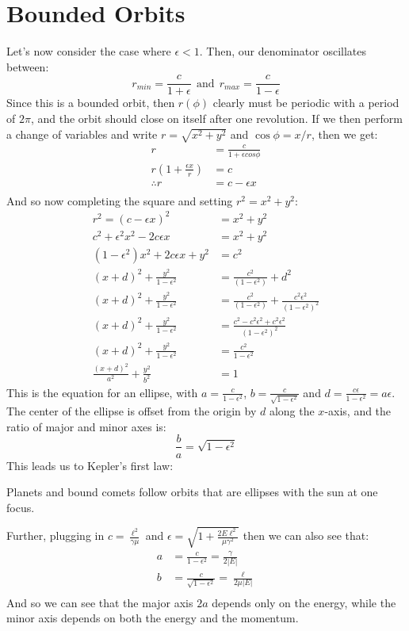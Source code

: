\section{Bounded Orbits}
Let's now consider the case where $\epsilon < 1$. Then, our denominator oscillates between: 
\[ r_{min} = \frac{c}{1 + \epsilon} \ \ \text{and} \ \ r_{max} = \frac{c}{1 - \epsilon}\] 
Since this is a bounded orbit, then $r(\phi)$ clearly must be periodic with a period of $2\pi$, and the orbit 
should close on itself after one revolution. If we then perform a change of variables and write $r = \sqrt{x^2 + 
y^2} $ and $\cos \phi = x/r$, then we get:
\begin{align*}
		r &= \frac{c}{1 + \epsilon cos \phi} \\
		r\left( 1 + \frac{\epsilon x}{r} \right) &=  c \\
		\therefore r &=  c - \epsilon x \\
\end{align*}
And so now completing the square and setting $r^2 = x^2 + y^2$: 
\begin{align*}
		r^2 = (c - \epsilon x)^2 &=  x^2 + y^2 \\
		c^2+ \epsilon^2 x^2 -2c\epsilon x &=  x^2 + y^2 \\
		(1 - \epsilon^2) x^2 + 2c\epsilon x + y^2 &=  c^2 \\
		(x + d)^2 + \frac{y^2}{1 - \epsilon^2} &= \frac{c^2}{(1 - \epsilon^2)} + d^2\\
		(x + d)^2 + \frac{y^2}{1 - \epsilon^2} &=  \frac{c^2}{(1 - \epsilon^2)} +
		\frac{c^2\epsilon^2}{(1 - \epsilon^2)^2} \\
		(x + d)^2 + \frac{y^2}{1 - \epsilon^2} &=  \frac{c^2 - c^2 \epsilon^2 + c^2 \epsilon^2}{(1 -
		\epsilon^2)^2} \\
		(x + d)^2 + \frac{y^2}{1 - \epsilon^2} &=  \frac{c^2}{1 - \epsilon^2} \\
		\frac{(x+d)^2}{a^2} + \frac{y^2}{b^2} &= 1
\end{align*}
This is the equation for an ellipse, with $a = \frac{c}{1 - \epsilon^2}$, $b = \frac{c}{\sqrt{1 - \epsilon^2} }$ 
and $d = \frac{c \epsilon}{1 - \epsilon^2} = a\epsilon$. The center of the ellipse is offset from the origin by 
$d$ along the $x$-axis, and the ratio of major and minor axes is: 
\[ \frac{b}{a}= \sqrt{1 - \epsilon^2} \]
This leads us to Kepler's first law: 
\begin{theorem*}{}
	Planets and bound comets follow orbits that are ellipses with the sun at one focus.	
\end{theorem*}
Further, plugging in $c = \frac{\ell^2}{\gamma \mu}$ and $\epsilon = \sqrt{1 + \frac{2 E \ell^2}{\mu \gamma^2}}$
then we can also see that: 
\begin{align*}
		a &= \frac{c}{1 - \epsilon^2} = \frac{\gamma}{2|E|}\\
		b &=  \frac{c}{\sqrt{1 - \epsilon^2} } = \frac{\ell}{2\mu |E|} \\
\end{align*}
And so we can see that the major axis $2a$ depends only on the energy, while the minor axis depends on both the 
energy and the momentum.


